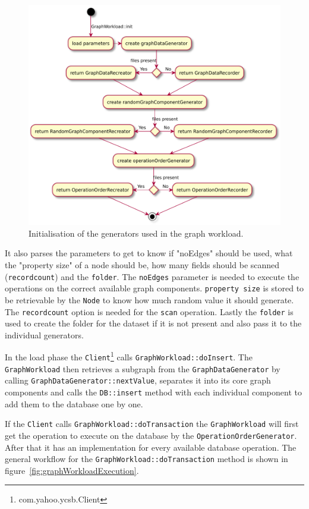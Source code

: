 \begin{figure}[h!]
  \includegraphics[width=\textwidth]{images/extensions/GraphWorkload}
  \caption{Initialisation of the generators used in the graph workload.}
  \label{fig:graphWorkloadInit}
\end{figure}

It also parses the parameters to get to know if "noEdges" should be used,
what the "property size" of a node should be,
how many fields should be scanned (\texttt{recordcount}) and the \texttt{folder}.
The \texttt{noEdges} parameter is needed to execute the operations on the correct available graph components.
\texttt{property size} is stored to be retrievable by the \texttt{Node} to know how much random value it should generate.
The \texttt{recordcount} option is needed for the \texttt{scan} operation.
Lastly the \texttt{folder} is used to create the folder for the dataset if it is not present and also pass it to the individual generators.

In the load phase the \texttt{Client}\footnote{com.yahoo.ycsb.Client} calls \texttt{GraphWorkload::doInsert}.
The \texttt{GraphWorkload} then retrieves a subgraph from the \texttt{GraphDataGenerator} by calling \texttt{GraphDataGenerator::nextValue},
separates it into its core graph components and calls the \texttt{DB::insert} method with each individual component to add them to the database one by one.

If the \texttt{Client} calls \texttt{GraphWorkload::doTransaction} the \texttt{GraphWorkload} will first get the operation to execute on the database by the \texttt{OperationOrderGenerator}.
After that it has an implementation for every available database operation.
The general workflow for the \texttt{GraphWorkload::doTransaction} method is shown in figure~\ref{fig:graphWorkloadExecution}.

